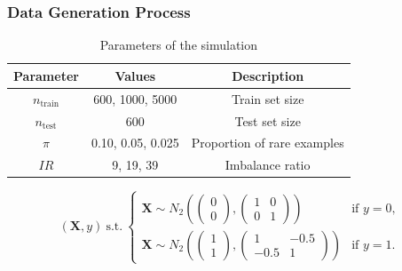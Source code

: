 \documentclass{beamer}
\begin{document}
\begin{frame}
  \frametitle{Data Generation Process}
  
  \small
  \begin{table}[h]
    \centering
    \begin{tabular}{|c|c|c|}
    \hline
    Parameter & Values & Description \\ 
    \hline
    $n_\text{train}$ & 600, 1000, 5000 & Train set size \\  
    $n_\text{test}$ & 600 & Test set size \\
    $\pi$ & 0.10, 0.05, 0.025 & Proportion of rare examples \\
    $IR$ & 9, 19, 39 & Imbalance ratio \\
    \hline
    \end{tabular}
    \caption{Parameters of the simulation}
    \label{table:parameters}
    \end{table}


    \small
    \begin{equation*}
      (\mathbf{X}, y) \ \text{s.t.} \
      \begin{cases} 
          \mathbf{X} \sim N_2\left(
            \begin{pmatrix}
            0 \\ 0
            \end{pmatrix},
            \begin{pmatrix}
            1 & 0 \\ 
            0 & 1
            \end{pmatrix}
            \right) & \text{if } y = 0, \\
          \mathbf{X} \sim N_2\left(
            \begin{pmatrix}
            1 \\ 1
            \end{pmatrix},
            \begin{pmatrix}
            1 & -0.5 \\ 
            -0.5 & 1
            \end{pmatrix}
            \right) & \text{if } y = 1.
      \end{cases}
  \end{equation*}
\end{frame}
\end{document}
